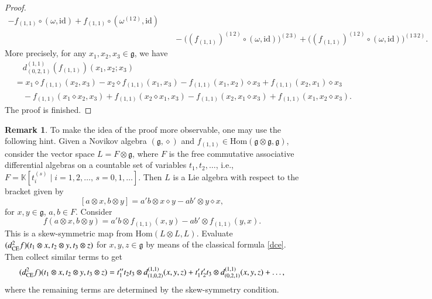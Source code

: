 \documentclass[12pt]{amsart}
\theoremstyle{definition}
\newtheorem{rmk}[thm]{Remark}
\newcommand{\g}{\mathfrak g}
\newcommand{\id}{\mathrm{id}}
\newcommand{\Hom}{\mathrm{Hom}}
\newcommand{\ff}{f_{(1,1)}}
\begin{document}
\begin{proof}
\begin{align*}
-\ff\circ(\omega,\id)
	+\ff\circ(\omega^{(1\,2)},\id)
	\\&\quad-\bigl((\ff)^{(1\,2)}\circ(\omega,\id)\bigr)^{(2\,3)}
	+\bigl((\ff)^{(1\,2)}\circ(\omega,\id)\bigr)^{(1\,3\,2)}.
\end{align*}
More precisely, for any $x_1,x_2,x_3\in\g$, we have
\begin{align*}
	&\quad d_{(0,2,1)}^{(1,1)}(f_{(1,1)})(x_1,x_2;x_3)\\
	&=x_1\diamond\ff(x_2,x_3)-x_2\diamond\ff(x_1,x_3)-\ff(x_1,x_2)\diamond x_3+\ff(x_2,x_1)\diamond x_3\\
	&\quad-\ff(x_1\diamond x_2,x_3)+\ff(x_2\diamond x_1,x_3)-\ff(x_2,x_1\diamond x_3)+\ff(x_1,x_2\diamond x_3).
\end{align*}
The proof is finished.
\end{proof}

\begin{rmk}
To make the idea of the proof more observable, one may use the following hint. Given a Novikov algebra $(\g,\diamond)$ and $f_{(1,1)}\in \Hom (\g\otimes \g, \g)$, consider the vector space
$L = F\otimes \g$, where $F$ is the
free commutative associative differential algebras on a countable set of variables $t_1,t_2,\dots $, i.e.,
$F=\mathds K[t_i^{(s)} \mid i=1,2,\dots,\, s=0,1,\dots ]$.
Then $L$ is a Lie algebra with respect to the bracket given by
\[
 [a\otimes x, b\otimes y] = a'b\otimes x\diamond y - ab'\otimes y\diamond x,
\]
for $x,y\in \g$, $a,b\in F$.
Consider
\[
 f(a\otimes x, b\otimes y) = a'b\otimes f_{(1,1)}(x,y) - ab'\otimes f_{(1,1)}(y,x).
\]
This is a skew-symmetric map from $\Hom (L\otimes L, L)$.
Evaluate $(d^2_{\rm CE}f)(t_1\otimes x, t_2\otimes y, t_3\otimes z)$
for $x,y,z \in \g$ by means of the classical formula \eqref{dce}.
Then collect similar terms to get
\[
 (d^2_{\rm CE}f)(t_1\otimes x, t_2\otimes y, t_3\otimes z)
 =
 t_1''t_2t_3 \otimes d^{(1,1)}_{(1,0,2)}(x,y,z) + t_1't_2't_3\otimes d^{(1,1)}_{(0,2,1)}(x,y,z) + \dots ,
\]
where the remaining terms are determined by the skew-symmetry condition.
\end{rmk}
\end{document}
